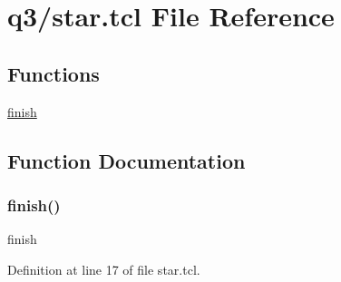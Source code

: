 \hypertarget{star_8tcl}{}\section{q3/star.tcl File Reference}
\label{star_8tcl}
\subsection*{Functions}
\begin{DoxyCompactItemize}
\item 
\hyperlink{star_8tcl_a30728837c246b65ef76298af0101d99c}{finish}
\end{DoxyCompactItemize}


\subsection{Function Documentation}
\mbox{\label{star_8tcl_a30728837c246b65ef76298af0101d99c}} 
\subsubsection{\texorpdfstring{finish()}{finish()}}
{\footnotesize\ttfamily finish}



Definition at line 17 of file star.\+tcl.

